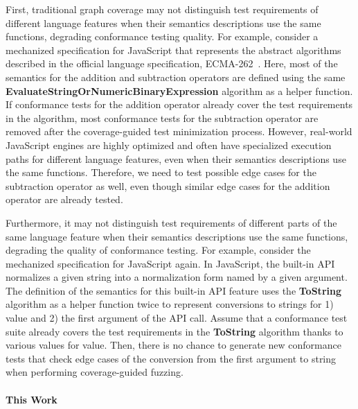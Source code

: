 \documentclass[acmsmall,review,screen]{acmart}
\newcommand{\jscode}[1]{\text{\lstinline[style=JS]!#1!}}
\begin{document}
First, traditional graph coverage may not distinguish test requirements of
different language features when their semantics descriptions
use the same functions, degrading conformance testing quality.
For example, consider a mechanized specification for JavaScript that represents the
abstract algorithms described in the official language specification, ECMA-262~\cite{es13}.
Here, most of the semantics for the addition and subtraction operators are
defined using the same \textbf{EvaluateStringOrNumericBinaryExpression}
algorithm as a helper function.
If conformance tests for the addition operator already cover the test
requirements in the algorithm, most conformance tests for the subtraction operator
are removed after the coverage-guided test minimization process.
However, real-world JavaScript engines are highly optimized and often have
specialized execution paths for different language features,
even when their semantics descriptions use the same functions.
Therefore, we need to test possible edge cases for the subtraction operator as
well, even though similar edge cases for the addition operator are already tested.


Furthermore, it may not distinguish test requirements of different
parts of the same language feature when their semantics descriptions
use the same functions, degrading the quality of conformance testing.
For example, consider the mechanized specification for JavaScript again.
In JavaScript, the \jscode{String.prototype.normalize} built-in API normalizes
a given string into a normalization form named by a given argument.
The definition of the semantics for this built-in API feature uses
the \textbf{ToString} algorithm as a helper function twice to represent
conversions to strings for 1) \jscode{this} value and 2) the first argument of the API call.
Assume that a conformance test suite already covers the test requirements in the
\textbf{ToString} algorithm thanks to various values for \jscode{this} value.
Then, there is no chance to generate new conformance tests that check edge cases
of the conversion from the first argument to string when performing coverage-guided fuzzing.


\paragraph{\textbf{This Work}}
\end{document}
